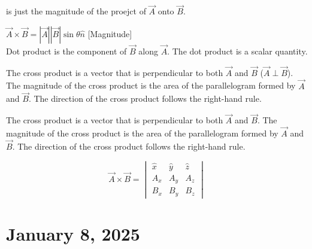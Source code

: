 \documentclass[11pt]{article}
\begin{document}
 is just the magnitude of the proejct of \(\vec{A}\) onto \(\vec{B}\).

$\vec{A} \times \vec{B} = |\vec{A}| |\vec{B}| \sin \theta \hat{n}$ [Magnitude] \\
Dot product is the component of $\vec{B}$ along $\vec{A}$. The dot product is a scalar quantity.

The cross product is a vector that is perpendicular to both \(\vec{A}\) and
\(\vec{B}\) (\(\vec{A} \perp \vec{B}\)). The magnitude of the cross product is
the area of the parallelogram formed by \(\vec{A}\) and \(\vec{B}\). The
direction of the cross product follows the right-hand rule.

    {The cross product is a vector that is perpendicular to both \(\vec{A}\) and \(\vec{B}\). The magnitude of the cross product is the area of the parallelogram formed by \(\vec{A}\) and \(\vec{B}\). The direction of the cross product follows the right-hand rule.}

\[
    \vec{A} \times \vec{B} = \begin{vmatrix}
        \hat{x} & \hat{y} & \hat{z} \\
        A_x     & A_y     & A_z     \\
        B_x     & B_y     & B_z
    \end{vmatrix}
\]
\section{January 8, 2025}
\end{document}
